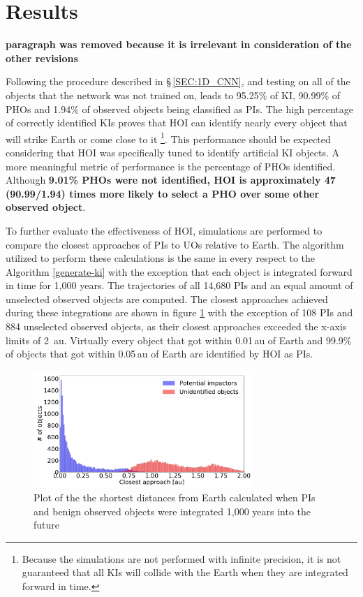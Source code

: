\documentclass{aa}
\begin{document}
\section{Results}
\label{SEC:Results}

\textbf{paragraph was removed because it is irrelevant in consideration of the other revisions}

Following the procedure described in \S\,\ref{SEC:1D_CNN}, and testing on all of the objects that the network was not trained on, leads to 95.25\% of KI, 90.99\% of PHOs and 1.94\% of observed objects being classified as PIs. The high percentage of correctly identified KIs proves that HOI can identify nearly every object that will strike Earth or come close to it \footnote{Because the simulations are not performed with infinite precision, it is not guaranteed that all KIs will collide with the Earth when they are integrated forward in time.}. This performance should be expected considering that HOI was specifically tuned to identify artificial KI objects. A more meaningful metric of performance is the percentage of PHOs identified. Although \textbf{9.01\% PHOs were not identified, HOI is approximately 47 (90.99/1.94) times more likely to select a PHO over some other observed object}.
 
To further evaluate the effectiveness of HOI, simulations are performed to compare the closest approaches of PIs to UOs relative to Earth. The algorithm utilized to perform these calculations is the same in every respect to the Algorithm \ref{generate-ki} with the exception that each object is integrated forward in time for 1,000 years. The trajectories of all 14,680 PIs and an equal amount of unselected observed objects are computed. The closest approaches achieved during these integrations are shown in figure \ref{FIG:Closeness_Histogram} with the exception of 108 PIs and 884 unselected observed objects, as their closest approaches exceeded the x-axis limits of 2 \,au. Virtually every object that got within 0.01\,au of Earth and 99.9\% of objects that got within 0.05\,au of Earth are identified by HOI as PIs. 
\begin{figure}[h]
	\hspace*{-0.35cm}
	\includegraphics[width=83mm]{images/3_Closest_Approach_Together.pdf}
	\centering
	\caption{\label{FIG:Closeness_Histogram} Plot of the  the shortest distances from Earth calculated when PIs and benign observed objects were integrated 1,000 years into the future}
\end{figure}
 
\end{document}
